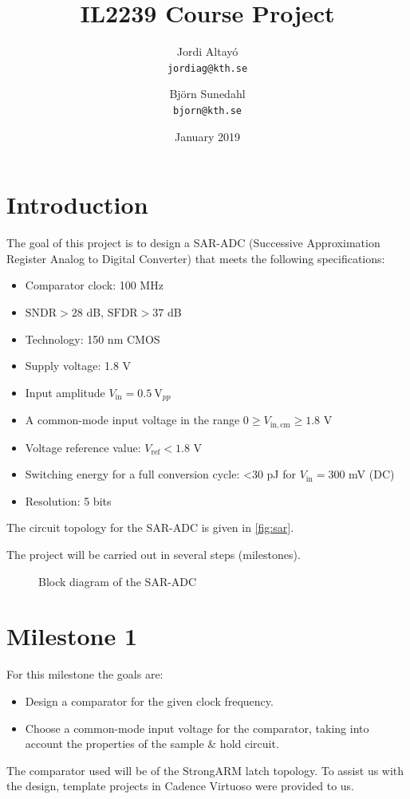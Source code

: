 \documentclass{article}
\title{IL2239 Course Project}
\author{Jordi Altayó \\\texttt{jordiag@kth.se}\and Björn Sunedahl\\\texttt{bjorn@kth.se}}
\date{January 2019}
\newcommand*{\subb}[1]{\ensuremath{_{\mathrm{#1}}}}
\begin{document}
 \maketitle
 \section*{Introduction}
 The goal of this project is to design a SAR-ADC (Successive Approximation Register Analog to Digital Converter) that meets the following specifications:
 \begin{itemize}
  \item Comparator clock: 100 MHz
  \item $\mathrm{SNDR} > 28$ dB, $\mathrm{SFDR} > 37$ dB
  \item Technology: 150 nm CMOS
  \item Supply voltage: 1.8 V
  \item Input amplitude $V\subb{in}=\SI{0.5}{\volt_{pp}}$
  \item A common-mode input voltage in the range $0 \ge V\subb{in,cm} \ge 1.8$ V
  \item Voltage reference value: $V\subb{ref}<1.8$ V
  \item Switching energy for a full conversion cycle: \textless 30 pJ for $V\subb{in}=300$ mV (DC)
  \item Resolution: 5 bits
 \end{itemize}
 The circuit topology for the SAR-ADC is given in \autoref{fig:sar}.\bigskip

 \noindent The project will be carried out in several steps (milestones).

 \begin{figure}[!h]
  \centering
  
  \caption{Block diagram of the SAR-ADC}
  \label{fig:sar}
 \end{figure}

 \section*{Milestone 1}
 \setcounter{section}{1}
 For this milestone the goals are:
 \begin{itemize}
  \item Design a comparator for the given clock frequency.
  \item Choose a common-mode input voltage for the comparator, taking into account the properties of the sample \& hold circuit.
 \end{itemize}
 The comparator used will be of the StrongARM latch topology. To assist us with the design, template projects in Cadence Virtuoso were provided to us.\bigskip
\end{document}
